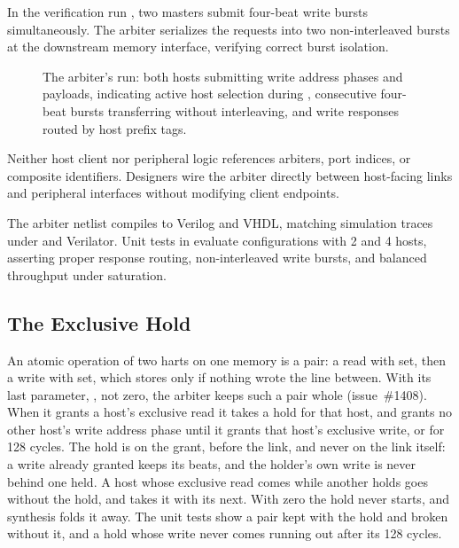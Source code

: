 \documentclass[journal,9pt]{IEEEtran}
\begin{document}
In the verification run , two masters submit four-beat
write bursts simultaneously. The arbiter serializes the requests into two
non-interleaved bursts at the downstream memory interface, verifying correct
burst isolation.

\begin{figure}[t]
\centering

\caption{The arbiter's run: both hosts submitting write address phases and
payloads,  indicating active host selection during ,
consecutive four-beat bursts transferring without interleaving, and write
responses routed by host prefix tags.}
\label{fig:a-arbiter}
\end{figure}





Neither host client nor peripheral logic references arbiters, port indices,
or composite identifiers. Designers wire the arbiter directly between
host-facing links and peripheral interfaces without modifying client
endpoints.

The arbiter netlist compiles to Verilog and VHDL, matching simulation traces
under  and Verilator. Unit tests in 
evaluate configurations with 2 and 4 hosts, asserting proper response
routing, non-interleaved write bursts, and balanced throughput under
saturation.

\subsection{The Exclusive Hold}

An atomic operation of two harts on one memory is a pair: a read with
 set, then a write with  set, which stores only
if nothing wrote the line between. With its last parameter,
, not zero, the arbiter keeps such a pair whole
(issue~\#1408). When it grants a host's exclusive read it takes a hold
for that host, and grants no other host's write address phase until it
grants that host's exclusive write, or for 128 cycles. The hold is on
the grant, before the link, and never on the link itself: a write
already granted keeps its beats, and the holder's own write is never
behind one held. A host whose exclusive read comes while another holds
goes without the hold, and takes it with its next. With 
zero the hold never starts, and synthesis folds it away. The unit
tests show a pair kept with the hold and broken without it, and a hold
whose write never comes running out after its 128 cycles.
\end{document}
